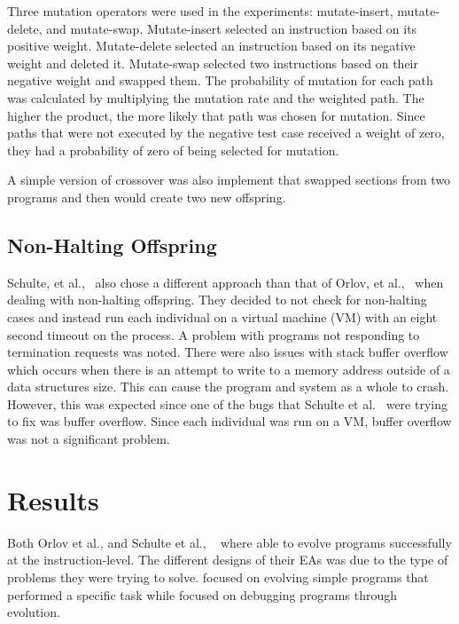 \documentclass{sig-alternate}
\begin{document}
Three mutation operators were used in the experiments: mutate-insert, mutate-delete, and mutate-swap. Mutate-insert selected an instruction based on its positive weight. Mutate-delete selected an instruction based on its negative weight and deleted it. Mutate-swap selected two instructions based on their negative weight and swapped them. The probability of mutation for each path was calculated by multiplying the mutation rate and the weighted path. The higher the product, the more likely that path was chosen for mutation. Since paths that were not executed by the negative test case received a weight of zero, they had a probability of zero of being selected for mutation.\par

A simple version of crossover was also implement that swapped sections from two programs and then would create two new offspring.

\subsection{Non-Halting Offspring}

Schulte, et al.,~\cite{Assembly:2010} also chose a different approach than that of Orlov, et al.,~\cite{FINCH:2011} when dealing with non-halting offspring. They decided to not check for non-halting cases and instead run each individual on a virtual machine (VM) with an eight second timeout on the process. A problem with programs not responding to termination requests was noted. There were also issues with stack buffer overflow which occurs when there is an attempt to write to a memory address outside of a data structures size. This can cause the program and system as a whole to crash. However, this was expected since one of the bugs that Schulte et al.~\cite{Assembly:2010} were trying to fix was buffer overflow. Since each individual was run on a VM, buffer overflow was not a significant problem.




\section{Results}
Both Orlov et al., and Schulte et al., ~\cite{FINCH:2011, Assembly:2010} where able to evolve programs successfully at the instruction-level. The different designs of their EAs was due to the type of problems they were trying to solve. \cite{FINCH:2011} focused on evolving simple programs that performed a specific task while \cite{Assembly:2010} focused on debugging programs through evolution.
\end{document}
